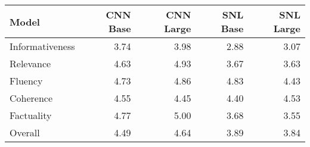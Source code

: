\begin{tabular}{lrrrr}
\toprule
Model & CNN Base & CNN Large & SNL Base & SNL Large \\
\midrule
Informativeness & 3.74 & 3.98 & 2.88 & 3.07 \\
Relevance & 4.63 & 4.93 & 3.67 & 3.63 \\
Fluency & 4.73 & 4.86 & 4.83 & 4.43 \\
Coherence & 4.55 & 4.45 & 4.40 & 4.53 \\
Factuality & 4.77 & 5.00 & 3.68 & 3.55 \\
Overall & 4.49 & 4.64 & 3.89 & 3.84 \\
\bottomrule
\end{tabular}
